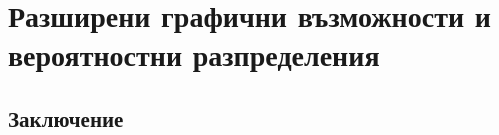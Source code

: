 \newpage
\chapter{Разширени графични възможности и вероятностни разпределения}
\label{chapter08}

\section*{Заключение}

